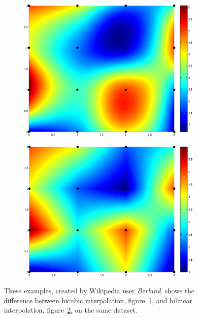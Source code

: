             \begin{figure}[H]
                \centering
                \begin{subfigure}{.5\textwidth}
                    \centering
                    \includegraphics[width=0.9\linewidth]{./images/Bicubic_Interpolation_Example.png}
                    \caption{}
                    \label{fig:example_bicubic}
                \end{subfigure}%
                \begin{subfigure}{.5\textwidth}
                    \includegraphics[width=0.9\linewidth]{./images/Bilinear_Interpolation_Example.png}
                    \caption{}
                    \label{fig:example_bilinear}
                \end{subfigure}
                \caption{These examples, created by Wikipedia user \emph{Berland}, shows the difference between bicubic interpolation, figure~\ref{fig:example_bicubic}, and bilinear interpolation, figure~\ref{fig:example_bilinear}, on the same dataset.}
                \label{fig:bicubic_vs_bilinear}
            \end{figure}

